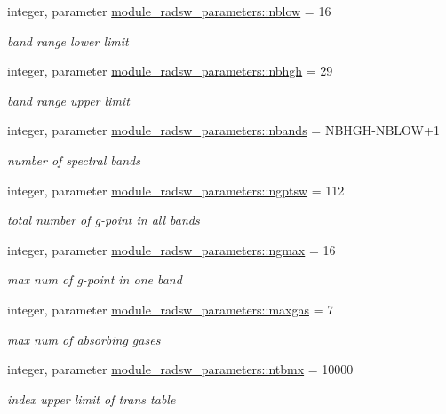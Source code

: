\begin{DoxyCompactItemize}
integer, parameter \hyperlink{group__module__radsw__main_ga2c5efc91f02dc0d4bdbd5e490f44c19c}{module\+\_\+radsw\+\_\+parameters\+::nblow} = 16
\begin{DoxyCompactList}\small\item\em band range lower limit \end{DoxyCompactList}\item 
integer, parameter \hyperlink{group__module__radsw__main_ga39e5ca4fd5defbc2545ee39bbf50d61b}{module\+\_\+radsw\+\_\+parameters\+::nbhgh} = 29
\begin{DoxyCompactList}\small\item\em band range upper limit \end{DoxyCompactList}\item 
integer, parameter \hyperlink{group__module__radsw__main_ga8f97b7698e8e5e2aec6e463fd09255cc}{module\+\_\+radsw\+\_\+parameters\+::nbands} = N\+B\+H\+GH-\/N\+B\+L\+OW+1
\begin{DoxyCompactList}\small\item\em number of spectral bands \end{DoxyCompactList}\item 
integer, parameter \hyperlink{group__module__radsw__main_gadc3e4d5a848d50e2883e05c62f61bc97}{module\+\_\+radsw\+\_\+parameters\+::ngptsw} = 112
\begin{DoxyCompactList}\small\item\em total number of g-\/point in all bands \end{DoxyCompactList}\item 
integer, parameter \hyperlink{group__module__radsw__main_ga0ba0ff5c18d3303a852d88687b4b5ca9}{module\+\_\+radsw\+\_\+parameters\+::ngmax} = 16
\begin{DoxyCompactList}\small\item\em max num of g-\/point in one band \end{DoxyCompactList}\item 
integer, parameter \hyperlink{group__module__radsw__main_ga5bc6fbb4231281a604352eec6b8e2bfc}{module\+\_\+radsw\+\_\+parameters\+::maxgas} = 7
\begin{DoxyCompactList}\small\item\em max num of absorbing gases \end{DoxyCompactList}\item 
integer, parameter \hyperlink{group__module__radsw__main_ga4bd72558be40bfccfb78c48e640acd07}{module\+\_\+radsw\+\_\+parameters\+::ntbmx} = 10000
\begin{DoxyCompactList}\small\item\em index upper limit of trans table \end{DoxyCompactList}\item 

\end{DoxyCompactItemize}
